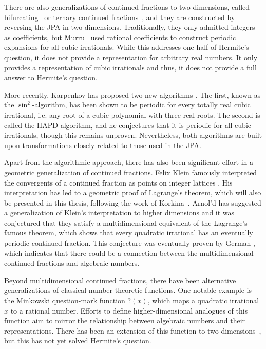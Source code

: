 There are also generalizations of continued fractions to two dimensions,
called bifurcating~\cite{Gupta00} or ternary continued fractions~\cite{Daus22},
and they are constructed by reversing the JPA in two dimensions.
Traditionally, they only admitted integers as coefficients,
but Murru~\cite{Murru15} used rational coefficients to construct periodic
expansions for all cubic irrationals.
While this addresses one half of Hermite’s question,
it does not provide a representation for arbitrary real numbers.
It only provides a representation of cubic irrationals
and thus, it does not provide a full answer to Hermite's question.

More recently, Karpenkov has proposed two new algorithms \cite{Karpenkov24, Karpenkov21}.
The first, known as the $\sin^2$-algorithm, has been shown to be periodic for
every totally real cubic irrational, i.e. any root of a cubic polynomial
with three real roots.
The second is called the HAPD algorithm, and he conjectures that it is periodic
for all cubic irrationals, though this remains unproven.
Nevertheless, both algorithms are built upon transformations closely related to
those used in the JPA.

Apart from the algorithmic approach,
there has also been significant effort in a geometric generalization of
continued fractions.
Felix Klein famously interpreted the convergents of a continued fraction as
points on integer lattices \cite{Klein95}.
His interpretation has led to a geometric proof of Lagrange’s theorem, which
will also be presented in this thesis, following the work of Korkina~\cite{Korkina96}.
Arnol'd has suggested a generalization of Klein's interpretation to higher
dimensions \cite{Arnold98} and it was conjectured that they satisfy a
multidimensional equivalent of the Lagrange's famous theorem,
which shows that every quadratic irrational has an eventually periodic
continued fraction.
This conjecture was eventually proven by German \cite{German08},
which indicates that there could be a connection between the multidimensional
continued fractions and algebraic numbers.

Beyond multidimensional continued fractions, there have been alternative
generalizations of classical number-theoretic functions.
One notable example is the Minkowski question-mark function $?(x)$,
which maps a quadratic irrational $x$ to a rational number.
Efforts to define higher-dimensional analogues of this function aim to mirror
the relationship between algebraic numbers and their representations.
There has been an extension of this function to two dimensions~\cite{Beaver04},
but this has not yet solved Hermite's question.

